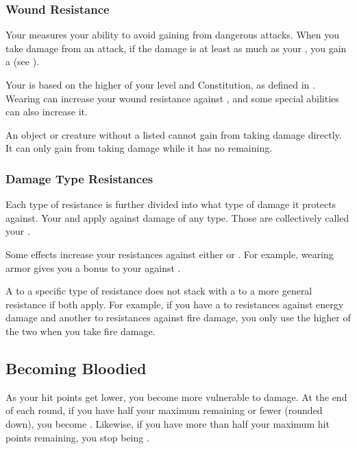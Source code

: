         \subsubsection{Wound Resistance}\label{Wound Resistance}
            Your  measures your ability to avoid gaining  from dangerous attacks.
            When you take damage from an attack, if the damage is at least as much as your , you gain a  (see ).

            Your  is based on the higher of your level and Constitution, as defined in .
            Wearing  can increase your wound resistance against , and some special abilities can also increase it.

             An object or creature without a listed  cannot gain  from taking damage directly.
            It can only gain  from taking damage while it has no  remaining.

        \subsubsection{Damage Type Resistances}\label{Damage Type Resistances}
            Each type of resistance is further divided into what type of damage it protects against.
            Your  and  apply against damage of any type.
            Those are collectively called your .

            Some effects increase your resistances against either  or .
            For example, wearing armor gives you a bonus to your  against .

             A  to a specific type of resistance does not stack with a  to a more general resistance if both apply.
            For example, if you have a  to resistances against energy damage and another  to resistances against fire damage, you only use the higher of the two when you take fire damage.

    \subsection{Becoming Bloodied}\label{Becoming Bloodied}
        As your hit points get lower, you become more vulnerable to damage.
        At the end of each round, if you have half your maximum  remaining or fewer (rounded down), you become .
        Likewise, if you have more than half your maximum hit points remaining, you stop being .

